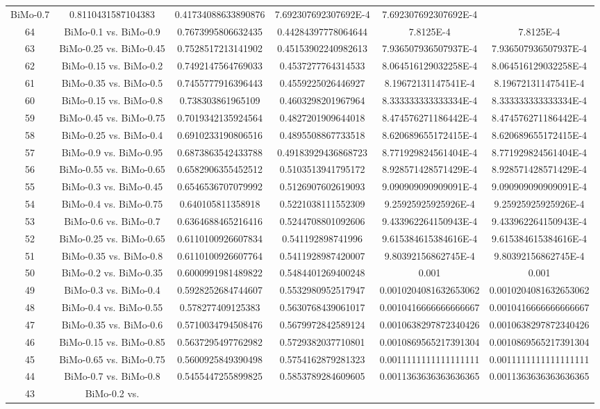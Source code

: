 \documentclass[a4paper,10pt]{article}
\begin{document}
\begin{landscape}
\begin{table}[!htp]
\begin{tabular}{cccccc}
BiMo-0.7&0.8110431587104383&0.41734088633890876&7.692307692307692E-4&7.692307692307692E-4\\64&BiMo-0.1 vs. BiMo-0.9&0.7673995806632435&0.44284397778064644&7.8125E-4&7.8125E-4\\63&BiMo-0.25 vs. BiMo-0.45&0.7528517213141902&0.45153902240982613&7.936507936507937E-4&7.936507936507937E-4\\62&BiMo-0.15 vs. BiMo-0.2&0.7492147564769033&0.4537277764314533&8.064516129032258E-4&8.064516129032258E-4\\61&BiMo-0.35 vs. BiMo-0.5&0.7455777916396443&0.4559225026446927&8.19672131147541E-4&8.19672131147541E-4\\60&BiMo-0.15 vs. BiMo-0.8&0.738303861965109&0.4603298201967964&8.333333333333334E-4&8.333333333333334E-4\\59&BiMo-0.45 vs. BiMo-0.75&0.7019342135924564&0.4827201909644018&8.474576271186442E-4&8.474576271186442E-4\\58&BiMo-0.25 vs. BiMo-0.4&0.6910233190806516&0.4895508867733518&8.620689655172415E-4&8.620689655172415E-4\\57&BiMo-0.9 vs. BiMo-0.95&0.6873863542433788&0.49183929436868723&8.771929824561404E-4&8.771929824561404E-4\\56&BiMo-0.55 vs. BiMo-0.65&0.6582906355452512&0.5103513941795172&8.928571428571429E-4&8.928571428571429E-4\\55&BiMo-0.3 vs. BiMo-0.45&0.6546536707079992&0.5126907602619093&9.090909090909091E-4&9.090909090909091E-4\\54&BiMo-0.4 vs. BiMo-0.75&0.640105811358918&0.5221038111552309&9.25925925925926E-4&9.25925925925926E-4\\53&BiMo-0.6 vs. BiMo-0.7&0.6364688465216416&0.5244708801092606&9.433962264150943E-4&9.433962264150943E-4\\52&BiMo-0.25 vs. BiMo-0.65&0.6110100926607834&0.541192898741996&9.615384615384616E-4&9.615384615384616E-4\\51&BiMo-0.35 vs. BiMo-0.8&0.6110100926607764&0.5411928987420007&9.80392156862745E-4&9.80392156862745E-4\\50&BiMo-0.2 vs. BiMo-0.35&0.6000991981489822&0.5484401269400248&0.001&0.001\\49&BiMo-0.3 vs. BiMo-0.4&0.5928252684744607&0.5532980952517947&0.0010204081632653062&0.0010204081632653062\\48&BiMo-0.4 vs. BiMo-0.55&0.578277409125383&0.5630768439061017&0.0010416666666666667&0.0010416666666666667\\47&BiMo-0.35 vs. BiMo-0.6&0.5710034794508476&0.5679972842589124&0.0010638297872340426&0.0010638297872340426\\46&BiMo-0.15 vs. BiMo-0.85&0.5637295497762982&0.5729382037710801&0.0010869565217391304&0.0010869565217391304\\45&BiMo-0.65 vs. BiMo-0.75&0.5600925849390498&0.5754162879281323&0.0011111111111111111&0.0011111111111111111\\44&BiMo-0.7 vs. BiMo-0.8&0.5455447255899825&0.5853789284609605&0.0011363636363636365&0.0011363636363636365\\43&BiMo-0.2 vs. 
\end{tabular}
\end{table}
\end{landscape}
\end{document}
